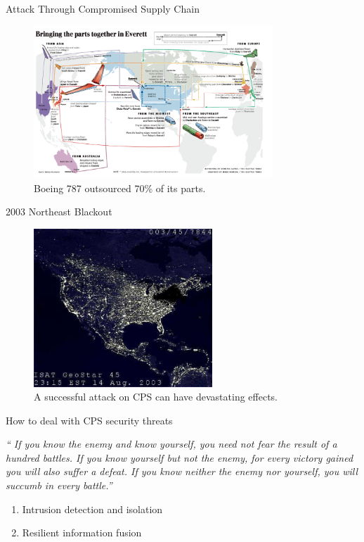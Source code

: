 \documentclass[10pt]{beamer}
\begin{document}
\begin{frame}{Attack Through Compromised Supply Chain}
  \begin{figure}[ht]
    \centering
    \includegraphics[width=0.8\textwidth]{boeing.jpg}
    \caption{Boeing 787 outsourced 70\% of its parts.}
  \end{figure}
\end{frame}

\begin{frame}{2003 Northeast Blackout}
  \begin{figure}[<+htpb+>]
    \begin{center}
      \includegraphics[width=0.60\textwidth]{blackout.jpg}
      \caption{A successful attack on CPS can have devastating effects.}
    \end{center}
  \end{figure}
\end{frame}

\begin{frame}{How to deal with CPS security threats}
  \begin{exampleblock}{}
    {\it `` If you know the enemy and know yourself, you need not fear the result of a hundred battles. If you know yourself but not the enemy, for every victory gained you will also suffer a defeat. If you know neither the enemy nor yourself, you will succumb in every battle.''}
    \vskip5mm
    \hspace*{}
  \end{exampleblock}

  \begin{enumerate}
  \item Intrusion detection and isolation
  \item Resilient information fusion
  \end{enumerate}
\end{frame}
\end{document}
